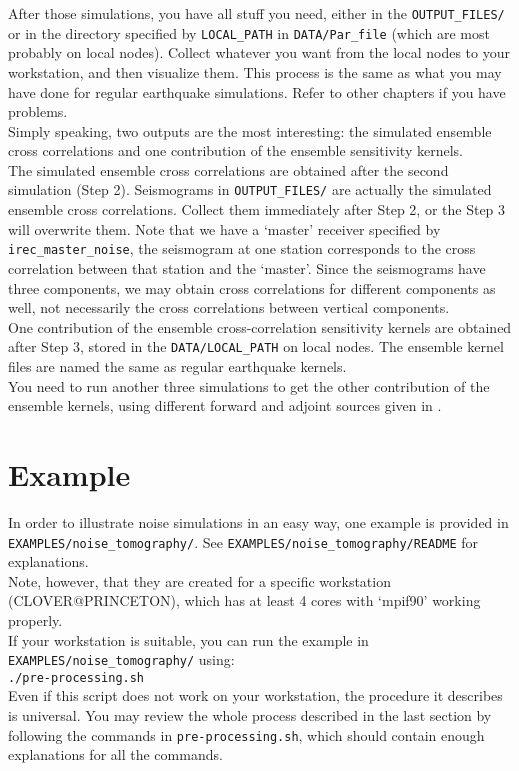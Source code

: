 After those simulations, you have all stuff you need, either in the
\texttt{OUTPUT\_FILES/} or in the directory specified by \texttt{LOCAL\_PATH}
in \texttt{DATA/Par\_file} (which are most probably on local nodes).
Collect whatever you want from the local nodes to your workstation,
and then visualize them. This process is the same as what you may
have done for regular earthquake simulations. Refer to other chapters
if you have problems.\\


Simply speaking, two outputs are the most interesting: the simulated
ensemble cross correlations and one contribution of the ensemble sensitivity
kernels.\\


The simulated ensemble cross correlations are obtained after the second
simulation (Step 2). Seismograms in \texttt{OUTPUT\_FILES/} are actually
the simulated ensemble cross correlations. Collect them immediately
after Step 2, or the Step 3 will overwrite them. Note that we have
a `master' receiver specified by \texttt{irec\_master\_noise}, the
seismogram at one station corresponds to the cross correlation between
that station and the `master'. Since the seismograms have three components,
we may obtain cross correlations for different components as well,
not necessarily the cross correlations between vertical components.\\


One contribution of the ensemble cross-correlation sensitivity kernels
are obtained after Step 3, stored in the \texttt{DATA/LOCAL\_PATH}
on local nodes. The ensemble kernel files are named the same as regular
earthquake kernels.\\


You need to run another three simulations to get the other contribution
of the ensemble kernels, using different forward and adjoint sources
given in \citet{trompetal2010}.


\section{Example}

In order to illustrate noise simulations in an easy way, one example
is provided in \texttt{EXAMPLES/noise\_tomography/}. See \texttt{EXAMPLES/noise\_tomography/README}
for explanations. \\


Note, however, that they are created for a specific workstation (CLOVER@PRINCETON),
which has at least 4 cores with `mpif90' working properly. \\


If your workstation is suitable, you can run the example in \texttt{EXAMPLES/noise\_tomography/}
using:\\


\texttt{./pre-processing.sh}\\


Even if this script does not work on your workstation, the procedure
it describes is universal. You may review the whole process described
in the last section by following the commands in \texttt{pre-processing.sh},
which should contain enough explanations for all the commands.

